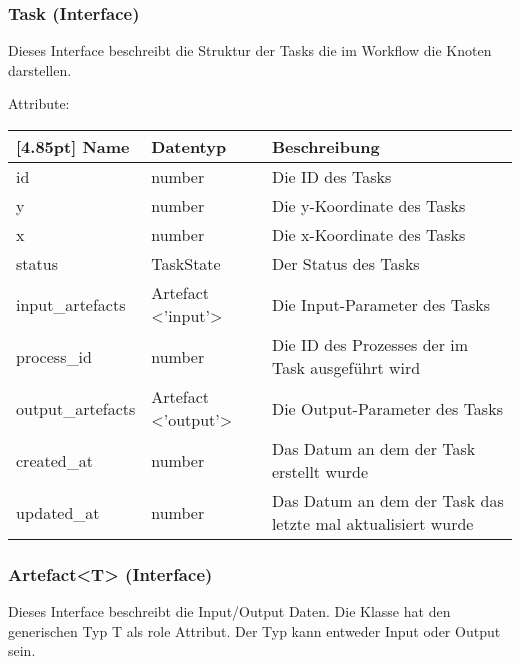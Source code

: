 			\subsubsection{Task (Interface)}
			
			Dieses Interface beschreibt die Struktur der Tasks die im Workflow die Knoten darstellen.\newline
			
			Attribute:
			\begin{center}
				\renewcommand{\arraystretch}{1.5}
				\setlength\tabcolsep{5pt}
				\begin{tabularx}{\textwidth}{|l|l|X|}
					\hline
					\rowcolor[gray]{0.75}[4.85pt]					
					Name & Datentyp & Beschreibung \\ \hline
					id & number & Die ID des Tasks \\ \hline
					y & number & Die y-Koordinate des Tasks\\ \hline
					x & number & Die x-Koordinate des Tasks \\ \hline
					status & TaskState & Der Status des Tasks \\ \hline
					input_artefacts & Artefact <'input'> & Die Input-Parameter des Tasks \\ \hline
					process_id & number & Die ID des Prozesses der im Task ausgeführt wird \\ \hline
					output_artefacts & Artefact <'output'> & Die Output-Parameter des Tasks \\ \hline
					created_at & number & Das Datum an dem der Task erstellt wurde \\ \hline
					updated_at & number & Das Datum an dem der Task das letzte mal aktualisiert wurde \\ \hline
				\end{tabularx}
			\end{center}
				
			\subsubsection{Artefact<T> (Interface)}
			
			Dieses Interface beschreibt die Input/Output Daten. Die Klasse hat den generischen Typ T als role Attribut. Der Typ kann entweder Input oder Output sein.\newline
			
